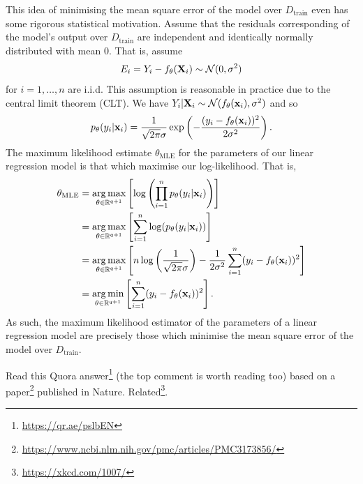 \documentclass[11pt]{article}
\begin{document}
This idea of minimising the mean square error of the model over $D_{\text{train}}$ even has some rigorous statistical motivation. Assume that the residuals corresponding of the model's output over $D_{\text{train}}$ are independent and identically normally distributed with mean 0. That is, assume
$$
E_i
=
Y_i-f_{\theta}(\mathbf{X}_i)\sim\mathcal{N}(0, \sigma^2)
$$
for $i=1,\dots,n$ are i.i.d. This assumption is reasonable in practice due to the central limit theorem (CLT). We have $Y_i|\mathbf{X}_i\sim\mathcal{N}(f_{\theta}(\mathbf{x}_i), \sigma^2)$ and so
$$
p_{\theta}(y_i|\mathbf{x}_i)=\frac{1}{\sqrt{2\pi}\sigma}\exp\left(-\frac{(y_i-f_{\theta}(\mathbf{x}_i))^2}{2\sigma^2}\right).
$$
The maximum likelihood estimate $\theta_{\text{MLE}}$ for the parameters of our linear regression model is that which maximise our log-likelihood. That is,
\begin{align*}
    \theta_{\text{MLE}}
    &=
    \operatorname*{arg\,max}_{\theta\in\mathbb{R}^{q+1}}\left[\log\left(\prod_{i=1}^n p_{\theta}(y_i|\mathbf{x}_i)\right)\right]\\
    &=
    \operatorname*{arg\,max}_{\theta\in\mathbb{R}^{q+1}}\left[\sum_{i=1}^n\log(p_{\theta}(y_i|\mathbf{x}_i))\right]\\
    &=
    \operatorname*{arg\,max}_{\theta\in\mathbb{R}^{q+1}}\left[n\log\left(\frac{1}{\sqrt{2\pi}\sigma}\right)-\frac{1}{2\sigma^2}\sum_{i=1}^n(y_i-f_{\theta}(\mathbf{x}_i))^2\right]\\
    &=
    \operatorname*{arg\,min}_{\theta\in\mathbb{R}^{q+1}}\left[\sum_{i=1}^n(y_i-f_{\theta}(\mathbf{x}_i))^2\right].
\end{align*}
As such, the maximum likelihood estimator of the parameters of a linear regression model are precisely those which minimise the mean square error of the model over $D_{\text{train}}$.

\begin{tcolorbox}[title={\textbf{Funny misuse of linear regression: Momentous sprint at the 2156 Olympics?}}, colback=myLightBlue, colbacktitle=myDarkBlue, colframe=myDarkBlue, coltitle=white]
    Read this Quora answer\footnote{\url{https://qr.ae/pslbEN}} (the top comment is worth reading too) based on a paper\footnote{\url{https://www.ncbi.nlm.nih.gov/pmc/articles/PMC3173856/}} published in Nature. Related\footnote{\url{https://xkcd.com/1007/}}.
\end{tcolorbox}
\end{document}
